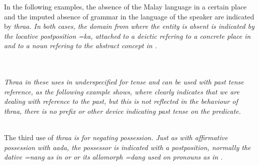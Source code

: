 

In the following examples, the absence of the Malay language in a certain place and the imputed absence of grammar in the language of the speaker are indicated by \em thraa\em. In both cases, the domain from where the entity is absent is indicated by the locative postposition \em =ka\em, attached to a deictic refering to a concrete place in  and to a noun refering to the abstract concept  in .



\\


 \\
\em Thraa \em in these uses in underspecified for tense and can be used with past tense reference, as the following example shows, where  clearly indicates that we are dealing with reference to the past, but this is not reflected in the behaviour of \em thraa\em, there is no prefix or other device indicating past tense on the predicate.


 \\


The third use of \em thraa \em is for negating possession. Just as with affirmative possession with \em aada\em {}, the possessor is indicated with a postposition, normally the dative \em =nang \em as in  or  or its allomorph \em =dang \em used on pronouns as in .


